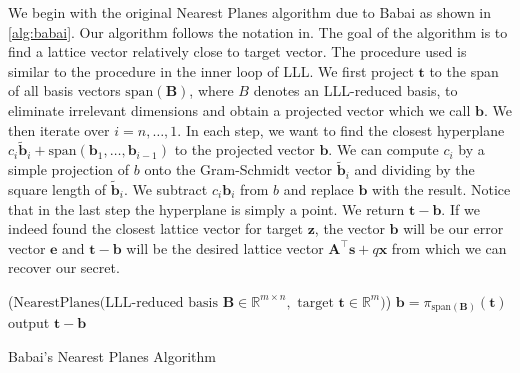 


We begin with the original Nearest Planes algorithm due to Babai \cite{Bab85} as shown in \cref{alg:babai}. Our algorithm follows the notation in\cite{NPReg04}. The goal of the algorithm is to find a lattice vector relatively close to target vector. The procedure used is similar to the procedure in the inner loop of LLL. We first project $\mathbf{t}$ to the span of all basis vectors $\text{span}(\mathbf{B})$, where $B$ denotes an LLL-reduced basis, to eliminate irrelevant dimensions and obtain a projected vector which we call $\mathbf{b}$. We then iterate over $i=n, \ldots, 1$. In each step, we want to find the closest hyperplane $c_i \tilde{\mathbf{b}}_i + \text{span}(\mathbf{b}_1, \dots, \mathbf{b}_{i-1})$ to the projected vector $\mathbf{b}$. We can compute $c_i$ by a simple projection of $b$ onto the Gram-Schmidt vector $\tilde{\mathbf{b}}_i$ and dividing by the square length of $\tilde{\mathbf{b}}_i$. We subtract $c_i \mathbf{b}_i$ from $b$ and replace $\mathbf{b}$ with the result. Notice that in the last step the hyperplane is simply a point. We return $\mathbf{t} - \mathbf{b}$. If we indeed found the closest lattice vector for target $\mathbf{z}$, the vector $\mathbf{b}$ will be our error vector $\mathbf{e}$ and $\mathbf{t} - \mathbf{b}$ will be the desired lattice vector  $\mathbf{A}^\intercal \mathbf{s} + q \mathbf{x}$ from which we can recover our secret.

\begin{algorithm2e}
  \Begin($\text{NearestPlanes} {(}\text{LLL-reduced basis }\mathbf{B} \in \mathbb{R}^{m \times n},\text{ target }\mathbf{t}\in \mathbb{R}^{m}{)}$)
  {
    $\mathbf{b} = \pi_{\text{span}(\mathbf{B})}(\mathbf{t})$\\
    output $\mathbf{t} - \mathbf{b}$\\
  }
  \caption[Babai's Nearest Planes Algorithm]{Babai's Nearest Planes Algorithm \cite{Bab85}}\label{alg:babai} %
\end{algorithm2e}

